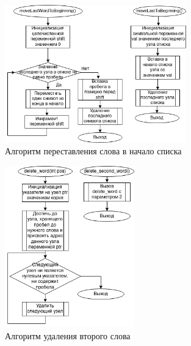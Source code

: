 \documentclass[a4paper, 14pt]{extarticle}
\begin{document}
\begin{figure}[htpb]
  \centering
  \includegraphics[width=0.7\textwidth]{pictures/moveLastWordToBeginning.png}
  \caption{Алгоритм переставления слова в начало списка}
  \label{fig:move_beginning}
\end{figure}

\begin{figure}[htpb]
  \centering
  \includegraphics[width=0.5\textwidth]{pictures/deleteSecondWord.png}
  \caption{Алгоритм удаления второго слова}
  \label{fig:delete_second}
\end{figure}
\end{document}
